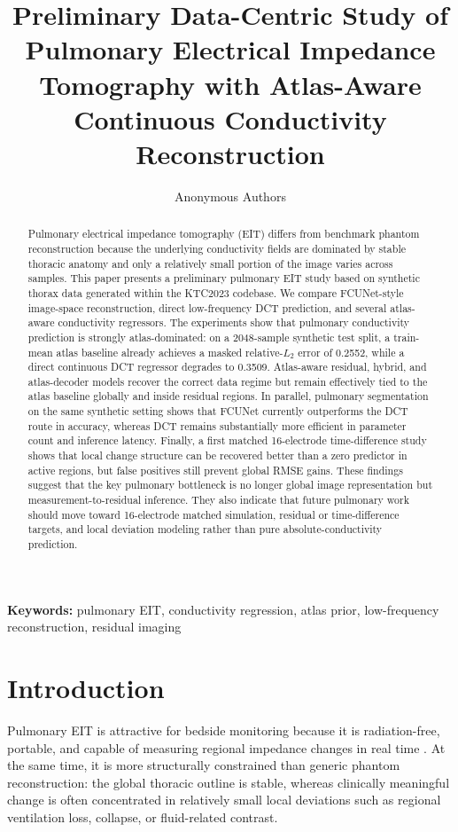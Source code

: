 \documentclass[11pt,a4paper]{article}
\title{Preliminary Data-Centric Study of Pulmonary Electrical Impedance Tomography with Atlas-Aware Continuous Conductivity Reconstruction}
\author{Anonymous Authors}
\date{}
\begin{document}
\maketitle

\begin{abstract}
Pulmonary electrical impedance tomography (EIT) differs from benchmark phantom reconstruction because the underlying conductivity fields are dominated by stable thoracic anatomy and only a relatively small portion of the image varies across samples. This paper presents a preliminary pulmonary EIT study based on synthetic thorax data generated within the KTC2023 codebase. We compare FCUNet-style image-space reconstruction, direct low-frequency DCT prediction, and several atlas-aware conductivity regressors. The experiments show that pulmonary conductivity prediction is strongly atlas-dominated: on a 2048-sample synthetic test split, a train-mean atlas baseline already achieves a masked relative-$L_2$ error of 0.2552, while a direct continuous DCT regressor degrades to 0.3509. Atlas-aware residual, hybrid, and atlas-decoder models recover the correct data regime but remain effectively tied to the atlas baseline globally and inside residual regions. In parallel, pulmonary segmentation on the same synthetic setting shows that FCUNet currently outperforms the DCT route in accuracy, whereas DCT remains substantially more efficient in parameter count and inference latency. Finally, a first matched 16-electrode time-difference study shows that local change structure can be recovered better than a zero predictor in active regions, but false positives still prevent global RMSE gains. These findings suggest that the key pulmonary bottleneck is no longer global image representation but measurement-to-residual inference. They also indicate that future pulmonary work should move toward 16-electrode matched simulation, residual or time-difference targets, and local deviation modeling rather than pure absolute-conductivity prediction.
\end{abstract}

\noindent\textbf{Keywords:} pulmonary EIT, conductivity regression, atlas prior, low-frequency reconstruction, residual imaging

\section{Introduction}
Pulmonary EIT is attractive for bedside monitoring because it is radiation-free, portable, and capable of measuring regional impedance changes in real time \cite{frerichs2017consensus}. At the same time, it is more structurally constrained than generic phantom reconstruction: the global thoracic outline is stable, whereas clinically meaningful change is often concentrated in relatively small local deviations such as regional ventilation loss, collapse, or fluid-related contrast.
\end{document}
